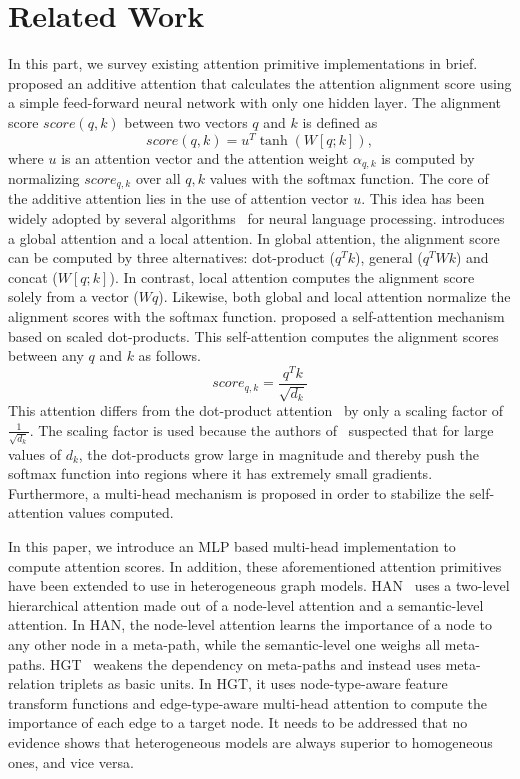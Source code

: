 \documentclass[sigconf]{acmart}
\begin{document}
\section{Related Work}
\label{sec:related}
In this part, we survey existing attention primitive implementations in brief.
\cite{bahdanau2014neural} proposed an additive attention that calculates the attention alignment score using a simple feed-forward neural network with only one hidden layer.
The alignment score $score(q,k)$ between two vectors $q$ and $k$ is defined as
\begin{equation}
	score(q,k) = u^T\tanh(W[q;k]), 
\end{equation}
where $u$ is an attention vector and the attention weight $\alpha_{q,k}$ is computed by normalizing $score_{q,k}$ over all ${q,k}$ values with the softmax function.
The core of the additive attention lies in the use of attention vector $u$.
This idea has been widely adopted by several algorithms~\cite{yang2016hierarchical, pavlopoulos2017deeper} for neural language processing.
\cite{luong2015effective} introduces a global attention and a local attention.
In global attention, the alignment score can be computed by three alternatives: dot-product ($q^Tk$), general ($q^TWk$) and concat ($W[q;k]$).
In contrast, local attention computes the alignment score solely from a vector ($Wq$).
Likewise, both global and local attention normalize the alignment scores with the softmax function.
\cite{vaswani2017attention} proposed a self-attention mechanism based on scaled dot-products.
This self-attention computes the alignment scores between any $q$ and $k$ as follows.
\begin{equation}
	score_{q,k} = \frac{q^Tk}{\sqrt{d_k}}
\end{equation}
This attention differs from the dot-product attention~\cite{luong2015effective} by only a scaling factor of $\frac{1}{\sqrt{d_k}}$.
The scaling factor is used because the authors of~\cite{vaswani2017attention} suspected that for large values of $d_k$, the dot-products grow large in magnitude and thereby push the softmax function into regions where it has extremely small gradients.
Furthermore, a multi-head mechanism is proposed in order to stabilize the self-attention values computed.

In this paper, we introduce an MLP based multi-head implementation to compute attention scores.
In addition, these aforementioned attention primitives have been extended to use in heterogeneous graph models.
HAN~\cite{wang2019heterogeneous} uses a two-level hierarchical attention made out of a node-level attention and a semantic-level attention.
In HAN, the node-level attention learns the importance of a node to any other node in a meta-path, while the semantic-level one weighs all meta-paths.
HGT~\cite{zhang2019heterogeneous} weakens the dependency on meta-paths and instead uses meta-relation triplets as basic units.
In HGT, it uses node-type-aware feature transform functions and edge-type-aware multi-head attention to compute the importance of each edge to a target node.
It needs to be addressed that no evidence shows that heterogeneous models are always superior to homogeneous ones, and vice versa. 
\end{document}
